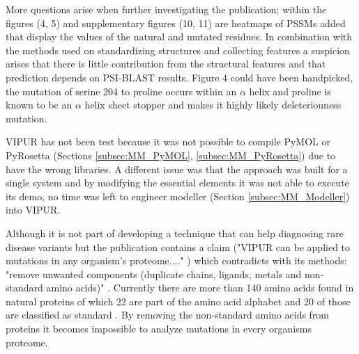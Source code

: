 
More questions arise when further investigating the publication; within the figures (4, 5) \cite{} and supplementary figures (10, 11) \cite{} are heatmaps of PSSMs added that display the values of the natural and mutated residues. In combination with the methods used on standardizing structures and collecting features a suspicion arises that there is little contribution from the structural features and that prediction depends on PSI-BLAST results. Figure 4 could have been handpicked, the mutation of serine 204 to proline occurs within an $\alpha$ helix and proline is known to be an $\alpha$ helix sheet stopper and makes it highly likely deleteriouness mutation.

VIPUR has not been test because it was not possible to compile PyMOL or PyRosetta (Sections \ref{subsec:MM_PyMOL}, \ref{subsec:MM_PyRosetta}) due to have the wrong libraries. A different issue was that the approach was built for a single system and by modifying the essential elements it was not able to execute its demo, no time was left to engineer modeller (Section \ref{subsec:MM_Modeller}) into VIPUR.



Although it is not part of developing a technique that can help diagnosing rare disease variants but the publication contains a claim ("VIPUR can be applied to mutations in any organism’s proteome...." \cite{}) which contradicts with its methods: "remove unwanted components (duplicate chains, ligands, metals and non-standard amino acids)" \cite{}. Currently there are more than 140 amino acids found in natural proteins of which 22 are part of the amino acid alphabet and 20 of those are classified as standard \cite{}. By removing the non-standard amino acids from proteins it becomes impossible to analyze mutations in every organisms proteome.

